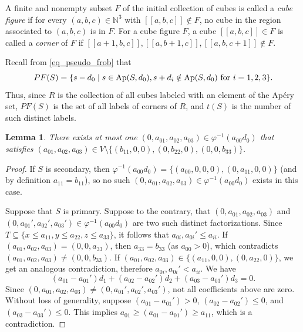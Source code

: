 \documentclass[12pt]{article}
\newtheorem{lemma}[thm]{Lemma}
\theoremstyle{remark}
\begin{document}
A finite and nonempty subset $F$ of the initial collection of cubes is called a \emph{cube figure} if for every $(a,b,c) \in \mathbb{N}^3$ with $[[a,b,c]] \notin F$, no cube in the region associated to $(a,b,c)$ is in $F$. For a cube figure $F$, a cube $[[a,b,c]] \in F$ is called a \emph{corner} of $F$ if $[[a+1,b,c]],[[a,b+1,c]],[[a,b,c+1]] \notin F$. 

Recall from \eqref{eq_pseudo_frob} that
\begin{equation}
     PF(S) = \{s - d_0 \mid s \in \textup{Ap}(S,d_0), s + d_i \notin \textup{Ap}(S,d_0) \text{ for } i = 1,2,3\}.
\end{equation}
Thus, since $R$ is the collection of all cubes labeled with an element of the Ap{\'e}ry set, $PF(S)$ is the set of all labels of corners of $R$, and $t(S)$ is the number of such distinct labels. 







\begin{lemma}\label{lemma_point0uniqueness}
    There exists at most one $(0,a_{01},a_{02},a_{03}) \in \varphi^{-1}(a_{00}d_0)$ that satisfies $(a_{01},a_{02},a_{03}) \in V \setminus \{(b_{11},0,0),(0,b_{22},0),(0,0,b_{33})\}$.
\end{lemma}
\begin{proof}
If $S$ is secondary, then $\varphi^{-1}(a_{00}d_0) = \{(a_{00},0,0,0), (0,a_{11},0,0)\}$ (and by definition $a_{11}=b_{11}$), so no such $(0,a_{01},a_{02},a_{03}) \in \varphi^{-1}(a_{00}d_0)$ exists in this case. 

Suppose that $S$ is primary. Suppose to the contrary, that $(0,a_{01},a_{02},a_{03})$ and $(0,a_{01}',a_{02}',a_{03}') \in \varphi^{-1}(a_{00}d_0)$ are two such distinct factorizations. Since $T \subseteq \{x \leq a_{11}, y \leq a_{22}, z \leq a_{33}\}$, it follows that $a_{0i}, a_{0i}' \leq a_{ii}$. If $(a_{01},a_{02},a_{03}) = (0,0,a_{33})$, then $a_{33}=b_{33}$ (as $a_{00}>0$), which contradicts $(a_{01},a_{02},a_{03}) \neq (0,0,b_{33})$. If  $(a_{01},a_{02},a_{03}) \in \{(a_{11},0,0) ,(0,a_{22},0) \}$, we get an analogous contradiction, therefore $a_{0i}, a_{0i}' < a_{ii}$.  We have
\begin{equation}
    (a_{01}-a_{01}')d_1 +  (a_{02}-a_{02}')d_2 + (a_{03}-a_{03}')d_3 = 0.
\end{equation}
Since $(0,a_{01},a_{02},a_{03}) \neq (0,a_{01}',a_{02}',a_{03}')$, not all coefficients above are zero.
Without loss of generality, suppose $(a_{01}-a_{01}') >0$, $(a_{02}-a_{02}') \leq 0$, and $(a_{03}-a_{03}') \leq 0$. This implies $a_{01} \geq (a_{01}-a_{01}') \geq a_{11}$, which is a contradiction.
\end{proof}
\end{document}
